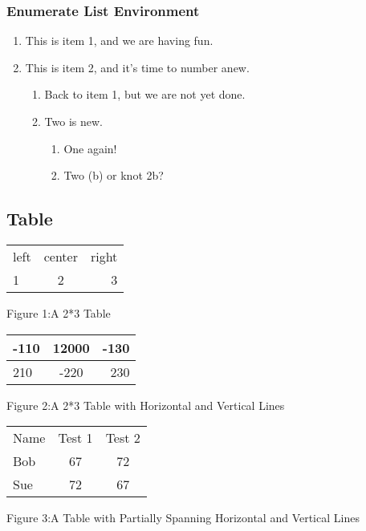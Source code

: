 \documentclass{article}
\begin{document}
\subsubsection{Enumerate List Environment}
\begin{enumerate}
	\item This is item 1, and we are having fun.
	\item This is item 2, and it’s time to number anew.
		\begin{enumerate}
			\item Back to item 1, but we are not yet done.
			\item Two is new.
				\begin{enumerate}
					\item One again!
					\item Two (b) or knot 2b?
				\end{enumerate}
		\end{enumerate}
\end{enumerate}

\subsection{Table}
\begin{center}
\begin{tabular}{lcr}
left & center & right \\
1 & 2 & 3
\end{tabular}\medskip

Figure 1:A 2*3 Table
\end{center} \bigskip
\begin{center}
\begin{tabular}{|l|c|r|} \hline
-110 & 12000 & -130 \\ \hline
210 & -220 & 230 \\ \hline
\end{tabular} \medskip

Figure 2:A 2*3 Table with Horizontal and Vertical Lines
\end{center} \bigskip

\begin{center}
\begin{tabular}{l|cc|}
Name & Test 1 & Test 2 \\ \cline{1-1}
Bob & 67 & 72 \\
Sue & 72 & 67 \\ \cline{2-3}
\end{tabular} \medskip

Figure 3:A Table with Partially Spanning Horizontal and Vertical Lines
\end{center}
\end{document}
